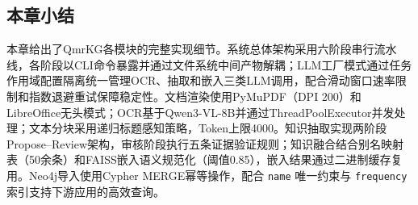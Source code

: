\subsection{本章小结}

本章给出了QmrKG各模块的完整实现细节。系统总体架构采用六阶段串行流水线，各阶段以CLI命令暴露并通过文件系统中间产物解耦；LLM工厂模式通过任务作用域配置隔离统一管理OCR、抽取和嵌入三类LLM调用，配合滑动窗口速率限制和指数退避重试保障稳定性。文档渲染使用PyMuPDF（DPI 200）和LibreOffice无头模式；OCR基于Qwen3-VL-8B并通过ThreadPoolExecutor并发处理；文本分块采用递归标题感知策略，Token上限4000。知识抽取实现两阶段Propose--Review架构，审核阶段执行五条证据验证规则；知识融合结合别名映射表（50余条）和FAISS嵌入语义规范化（阈值0.85），嵌入结果通过二进制缓存复用。Neo4j导入使用Cypher MERGE幂等操作，配合 \texttt{name} 唯一约束与 \texttt{frequency} 索引支持下游应用的高效查询。
